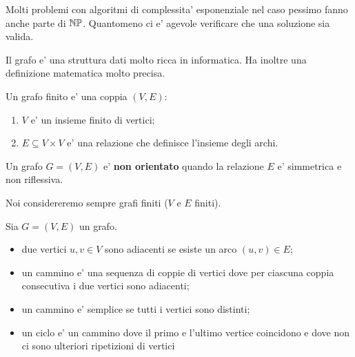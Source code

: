 Molti problemi con algoritmi di complessita' esponenziale nel caso pessimo fanno anche parte di
$\mathbb{NP}$. Quantomeno ci e' agevole verificare che una soluzione sia valida.

Il grafo e' una struttura dati molto ricca in informatica. Ha inoltre una definizione matematica
molto precisa.

\begin{defn}
    Un grafo finito e' una coppia $(V,E)$:
    \begin{enumerate}
        \item $V$ e' un insieme finito di vertici;
        \item $E \subseteq V \times V$ e' una relazione che definisce l'insieme degli archi.
    \end{enumerate}
\end{defn}

Un grafo $G = (V,E)$ e' \textbf{non orientato} quando la relazione $E$ e' simmetrica e non
riflessiva.

Noi considereremo sempre grafi finiti ($V$ e $E$ finiti).

\begin{defn}
    Sia $G = (V,E)$ un grafo.
    \begin{itemize}
        \item due vertici $u,v \in V$ sono adiacenti se esiste un arco $(u,v) \in E$;
        \item un cammino e' una sequenza di coppie di vertici dove per ciascuna coppia consecutiva
        i due vertici sono adiacenti;
        \item un cammino e' semplice se tutti i vertici sono distinti;
        \item un ciclo e' un cammino dove il primo e l'ultimo vertice coincidono e dove non ci sono
        ulteriori ripetizioni di vertici
    \end{itemize}
\end{defn}


